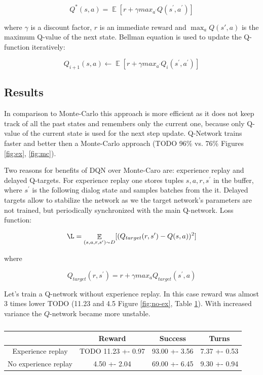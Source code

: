 \documentclass[12pt,titlepage,a4paper]{article}
\DeclareMathOperator*{\E}{\mathbb{E}}
\begin{document}
\[ Q^*(s,a) = \E [r + \gamma max_{a^\prime}Q(s^\prime,a^\prime)] \] 

where $\gamma$ is a discount factor,  $r$ is an immediate reward and $\max_a Q(s',a)$ is the maximum Q-value of the next state. Bellman equation is used to update the Q-function iteratively:

\[Q_{i + 1} (s,a) \leftarrow \E[r + \gamma max_{a^\prime}Q_{i}(s^\prime,a^\prime)]\]

\subsection{Results}

In comparison to Monte-Carlo this approach is more efficient as it does not keep track of all the past states and remembers only the current one, because only Q-value of the current state is used for the next step update. Q-Network trains faster and better then a Monte-Carlo approach (TODO 96\% vs. 76\% Figures \ref{fig:ex}, \ref{fig:mc}). 

Two reasons for benefits of DQN over Monte-Caro are: experience replay and delayed Q-targets. For experience replay one stores tuples ${s, a, r, s^\prime}$ in the buffer, where $s^\prime$ is the following dialog state and samples batches from the it. Delayed targets allow to stabilize the network as we the target network’s parameters are not trained, but periodically synchronized with the main Q-network. Loss function:

\[\L = \E_{(s, a, r, s^\prime) \sim D} [(Q_{target}(r,s^\prime) - Q(s, a))^2]\]

where 

\[Q_{target}(r, s^\prime) = r + \gamma max_{a}Q_{target}(s^\prime,a)\]

Let's train a Q-network without experience replay. In this case reward was almost 3 times lower TODO (11.23 and 4.5 Figure \ref{fig:no-ex}, Table \ref{tab:replay-no-replay}). With increased variance the $Q$-network became more unstable.
\begin{table}[!h]
    \centering
    \begin{tabular}{||c c c c||} 
     \hline
      & Reward & Success & Turns \\ [0.5ex] 
     \hline\hline
     Experience replay & TODO 11.23 +- 0.97 & 93.00 +- 3.56 & 7.37 +- 0.53 \\ 
     \hline
     No experience replay & 4.50 +- 2.04 & 69.00 +- 6.45 & 9.30 +- 0.94 \\
     \hline
    \end{tabular}
    \caption{}
    \label{tab:replay-no-replay}
\end{table}
\end{document}
